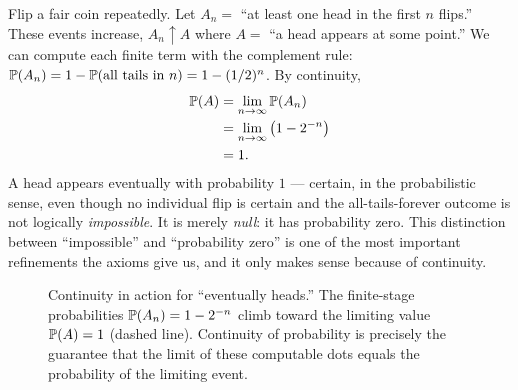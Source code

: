 \begin{example}
\label{ch03:ex-eventually}
Flip a fair coin repeatedly. Let $A_n = $ ``at least one head in the first $n$
flips.'' These events increase, $A_n \uparrow A$ where $A = $ ``a head appears at
some point.'' We can compute each finite term with the complement rule:
$\P(A_n) = 1 - \P(\text{all tails in } n) = 1 - (1/2)^n$. By continuity,
\begin{align*}
\P(A) &= \lim_{n \to \infty} \P(A_n) \\
&= \lim_{n\to\infty}\big(1 - 2^{-n}\big) \\
&= 1.
\end{align*}
A head appears eventually with probability $1$ --- certain, in the
probabilistic sense, even though no individual flip is certain and the
all-tails-forever outcome is not logically \emph{impossible}. It is merely
\emph{null}: it has probability zero. This distinction between ``impossible'' and
``probability zero'' is one of the most important refinements the axioms give
us, and it only makes sense because of continuity.
\end{example}

\begin{figure}[H]
\centering
{}
\caption{Continuity in action for ``eventually heads.'' The finite-stage
probabilities $\P(A_n)=1-2^{-n}$ climb toward the limiting value $\P(A)=1$
(dashed line). Continuity of probability is precisely the guarantee that the
limit of these computable dots equals the probability of the limiting event.}
\label{ch03:fig-continuity}
\end{figure}

